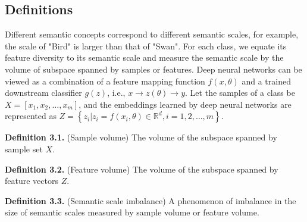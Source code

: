 \documentclass[10pt]{article} %
\begin{document}
\subsection{Definitions}

Different semantic concepts correspond to different semantic scales, for example, the scale of "Bird" is larger than that of "Swan". For each class, we equate its feature diversity to its semantic scale and measure the semantic scale by the volume of subspace spanned by samples or features. Deep neural networks can be viewed as a combination of a feature mapping function $f({x,\theta})$ and a trained downstream classifier $g(z)$, i.e., $x\to z( \theta )\to y$. Let the samples of a class be $X=[ {{x_1},{x_2}, \ldots ,{x_m}} ]$, and the embeddings learned by deep neural networks are represented as $Z = \left\{ {{z_i}|{z_i} = f( {{x_i},\theta } ) \in {\mathbb{R}^d},i = 1,2, \ldots ,m} \right\}$.

\textbf{Deﬁnition 3.1.} (Sample volume) The volume of the subspace spanned by sample set $X$.

\textbf{Deﬁnition 3.2.} (Feature volume) The volume of the subspace spanned by feature vectors $Z$.

\textbf{Deﬁnition 3.3.} (Semantic scale imbalance) A phenomenon of imbalance in the size of semantic scales measured by sample volume or feature volume.
\end{document}
